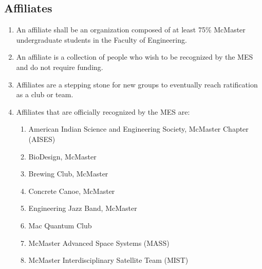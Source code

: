 \subsection{Affiliates}
\label{affiliates}
\begin{enumerate}
 \item
  An affiliate shall be an organization composed of at least 75\% McMaster undergraduate students in the Faculty of Engineering.
 \item
  An affiliate is a collection of people who wish to be recognized by the MES and do not require funding.
 \item
  Affiliates are a stepping stone for new groups to eventually reach ratification as a club or team.
 \item
  Affiliates that are officially recognized by the MES are:

  \begin{enumerate}
   \item
    American Indian Science and Engineering Society, McMaster Chapter (AISES)
   \item
    BioDesign, McMaster
   \item
    Brewing Club, McMaster
   \item
    Concrete Canoe, McMaster
   \item
    Engineering Jazz Band, McMaster
   \item
    Mac Quantum Club
   \item
    McMaster Advanced Space Systems (MASS)
   \item
    McMaster Interdisciplinary Satellite Team (MIST)
  \end{enumerate}
\end{enumerate}

